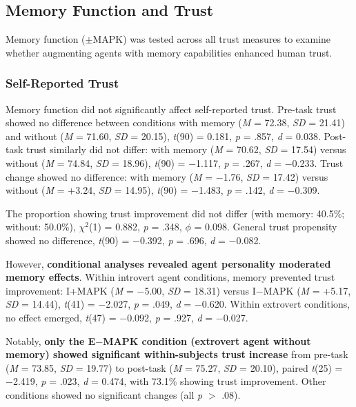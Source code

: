 \documentclass[12pt]{article}
\begin{document}
\subsection{Memory Function and Trust}

Memory function ($\pm$MAPK) was tested across all trust measures to examine whether augmenting agents with memory capabilities enhanced human trust.

\subsubsection{Self-Reported Trust}

Memory function did not significantly affect self-reported trust. Pre-task trust showed no difference between conditions with memory (\textit{M} = 72.38, \textit{SD} = 21.41) and without (\textit{M} = 71.60, \textit{SD} = 20.15), \textit{t}(90) = 0.181, \textit{p} = .857, \textit{d} = 0.038. Post-task trust similarly did not differ: with memory (\textit{M} = 70.62, \textit{SD} = 17.54) versus without (\textit{M} = 74.84, \textit{SD} = 18.96), \textit{t}(90) = $-$1.117, \textit{p} = .267, \textit{d} = $-$0.233. Trust change showed no difference: with memory (\textit{M} = $-$1.76, \textit{SD} = 17.42) versus without (\textit{M} = +3.24, \textit{SD} = 14.95), \textit{t}(90) = $-$1.483, \textit{p} = .142, \textit{d} = $-$0.309.

The proportion showing trust improvement did not differ (with memory: 40.5\%; without: 50.0\%), $\chi^2$(1) = 0.882, \textit{p} = .348, $\phi$ = 0.098. General trust propensity showed no difference, \textit{t}(90) = $-$0.392, \textit{p} = .696, \textit{d} = $-$0.082.

However, \textbf{conditional analyses revealed agent personality moderated memory effects}. Within introvert agent conditions, memory prevented trust improvement: I+MAPK (\textit{M} = $-$5.00, \textit{SD} = 18.31) versus I$-$MAPK (\textit{M} = +5.17, \textit{SD} = 14.44), \textit{t}(41) = $-$2.027, \textit{p} = .049, \textit{d} = $-$0.620. Within extrovert conditions, no effect emerged, \textit{t}(47) = $-$0.092, \textit{p} = .927, \textit{d} = $-$0.027.

Notably, \textbf{only the E$-$MAPK condition (extrovert agent without memory) showed significant within-subjects trust increase} from pre-task (\textit{M} = 73.85, \textit{SD} = 19.77) to post-task (\textit{M} = 75.27, \textit{SD} = 20.10), paired \textit{t}(25) = $-$2.419, \textit{p} = .023, \textit{d} = 0.474, with 73.1\% showing trust improvement. Other conditions showed no significant changes (all \textit{p} $>$ .08).
\end{document}

